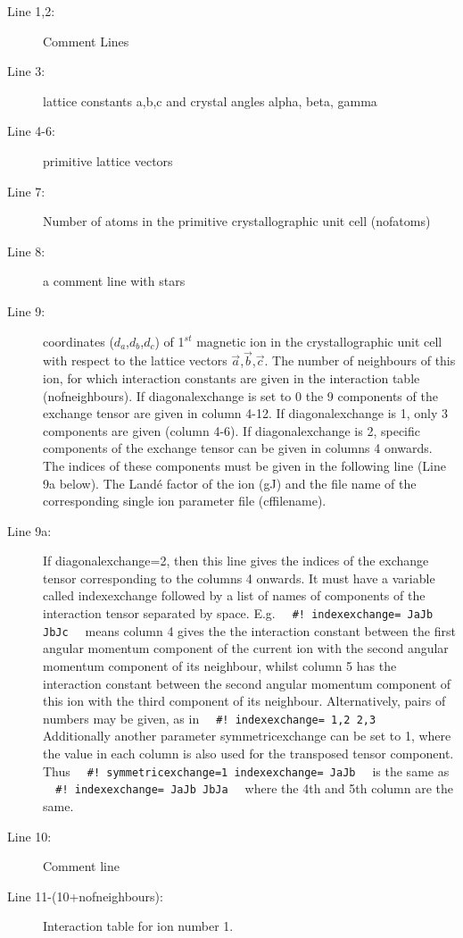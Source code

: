 \begin{description}
\item [Line 1,2:] Comment Lines
\item [Line 3:] lattice constants a,b,c and crystal angles alpha, beta, gamma 
\item [Line 4-6:] primitive lattice vectors
\item [Line 7:] Number of atoms in the primitive crystallographic unit cell ({\prg nofatoms})
\item [Line 8:] a comment line with stars
\item [Line 9:] coordinates  ($d_a$,$d_b$,$d_c$) of 1$^{st}$ magnetic ion in the crystallographic unit cell  with
respect to the lattice vectors $\vec a$,$\vec b$,$\vec c$. The number of neighbours of this 
ion, for which interaction constants are given in the interaction table (nofneighbours). 
If {\prg diagonalexchange}
is set to 0 the 9 components of the exchange tensor are given in column 4-12. 
If {\prg diagonalexchange}
 is 1, only 3 components are given (column 4-6).
If {\prg diagonalexchange}
 is 2, specific components of the exchange tensor can be given in columns 4 onwards. The indices of these components
 must be given in the following line (Line 9a below).
The Land\'e factor of the ion (gJ) and the file name of the corresponding single ion
parameter file (cffilename).
\item [Line 9a:]  If {\prg diagonalexchange=2}, then this line gives the indices of the exchange tensor corresponding to 
 the columns 4 onwards. It must have a variable called {\prg indexexchange} followed by a list of names of components of the interaction
 tensor separated by space. E.g.
 \verb|  #! indexexchange= JaJb JbJc  | 
means column 4 gives the the interaction constant between the
 first angular momentum component of the current ion with the second angular momentum component of its neighbour, whilst 
 column 5 has the interaction constant between the second angular momentum component of this ion with the third component of its
 neighbour. Alternatively, pairs of numbers may be given, as in \verb|  #! indexexchange= 1,2 2,3  |
 Additionally another parameter {\prg symmetricexchange} can be set to 1, where the value in each column is also used 
 for the transposed tensor component. Thus \verb|  #! symmetricexchange=1 indexexchange= JaJb  | is the same as \\
 \verb|  #! indexexchange= JaJb JbJa  | where the 4th and 5th column are the same.
\item [Line 10:]  Comment line
\item [Line 11-(10+nofneighbours):] Interaction table for ion number 1.   

\end{description}
